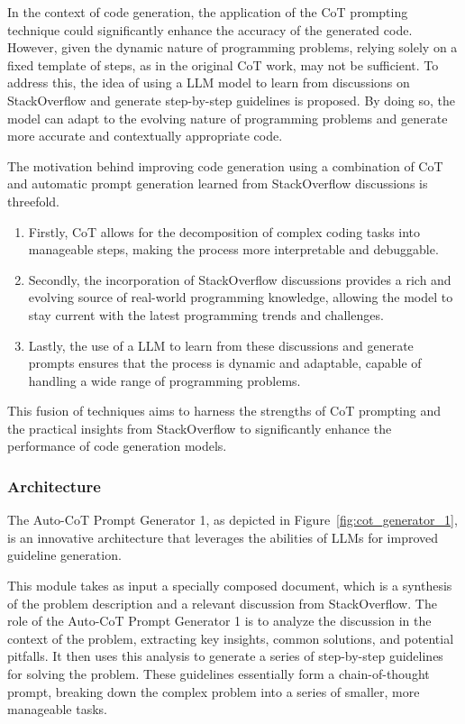 \documentclass[a4paper,oneside]{book}
\begin{document}
In the context of code generation, the application of the CoT prompting technique could significantly enhance the accuracy of the generated code. However, given the dynamic nature of programming problems, relying solely on a fixed template of steps, as in the original CoT work, may not be sufficient. To address this, the idea of using a LLM model to learn from discussions on StackOverflow and generate step-by-step guidelines is proposed. By doing so, the model can adapt to the evolving nature of programming problems and generate more accurate and contextually appropriate code.

The motivation behind improving code generation using a combination of CoT and automatic prompt generation learned from StackOverflow discussions is threefold.

\begin{enumerate}
  \item Firstly, CoT allows for the decomposition of complex coding tasks into manageable steps, making the process more interpretable and debuggable.
  \item Secondly, the incorporation of StackOverflow discussions provides a rich and evolving source of real-world programming knowledge, allowing the model to stay current with the latest programming trends and challenges.
  \item Lastly, the use of a LLM to learn from these discussions and generate prompts ensures that the process is dynamic and adaptable, capable of handling a wide range of programming problems.
\end{enumerate}

This fusion of techniques aims to harness the strengths of CoT prompting and the practical insights from StackOverflow to significantly enhance the performance of code generation models.

\subsubsection{Architecture}
The Auto-CoT Prompt Generator 1, as depicted in Figure~\ref{fig:cot_generator_1}, is an innovative architecture that leverages the abilities of LLMs for improved guideline generation.

This module takes as input a specially composed document, which is a synthesis of the problem description and a relevant discussion from StackOverflow. The role of the Auto-CoT Prompt Generator 1 is to analyze the discussion in the context of the problem, extracting key insights, common solutions, and potential pitfalls. It then uses this analysis to generate a series of step-by-step guidelines for solving the problem. These guidelines essentially form a chain-of-thought prompt, breaking down the complex problem into a series of smaller, more manageable tasks.
\end{document}
